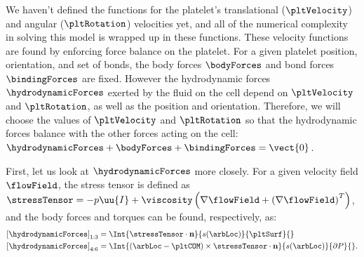 We haven't defined the functions for the platelet's translational
($\pltVelocity$) and angular ($\pltRotation$) velocities yet, and all
of the numerical complexity in solving this model is wrapped up in
these functions. These velocity functions are found by enforcing force
balance on the platelet. For a given platelet position, orientation,
and set of bonds, the body forces $\bodyForces$ and bond forces
$\bindingForces$ are fixed. However the hydrodynamic forces
$\hydrodynamicForces$ exerted by the fluid on the cell depend on
$\pltVelocity$ and $\pltRotation$, as well as the position and
orientation. Therefore, we will choose the values of $\pltVelocity$
and $\pltRotation$ so that the hydrodynamic forces balance with the
other forces acting on the cell: $\hydrodynamicForces + \bodyForces +
\bindingForces = \vect{0}$.

First, let us look at $\hydrodynamicForces$ more closely. For a given
velocity field $\flowField$, the stress tensor is defined as
$\stressTensor = -p \uu{I} + \viscosity \left(\nabla \flowField +
  \left(\nabla \flowField\right)^T\right)$, and the body forces and
torques can be found, respectively, as:
\begin{align}
  \left[\hydrodynamicForces\right]_{1:3} &= \Int{\stressTensor \cdot
  \mathbf{n}}{s(\arbLoc)}{\pltSurf}{} \label{eq:body-force} \\
  \left[\hydrodynamicForces\right]_{4:6} &= \Int{(\arbLoc - \pltCOM)
  \times \stressTensor \cdot \mathbf{n}}{s(\arbLoc)}{\partial
  P}{}. \label{eq:body-torque} 
\end{align}

